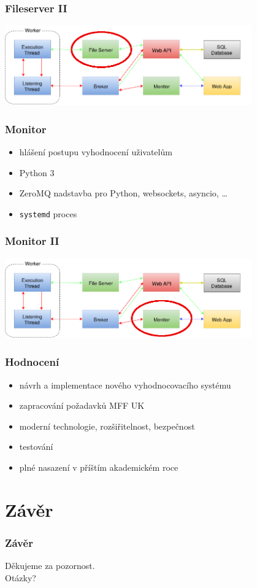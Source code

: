 \documentclass{beamer}
\begin{document}
\begin{frame}
	\frametitle{Fileserver II}
	\begin{center}
		\includegraphics[width=0.8\textwidth]{images/communication-fileserver.png}
	\end{center}
\end{frame}

\begin{frame}
	\frametitle{Monitor}
	\begin{itemize}
		\item hlášení postupu vyhodnocení uživatelům
		\item Python 3
		\item ZeroMQ nadstavba pro Python, websockets, asyncio, \dots
		\item \texttt{systemd} proces
	\end{itemize}
\end{frame}

\begin{frame}
	\frametitle{Monitor II}
	\begin{center}
		\includegraphics[width=0.8\textwidth]{images/communication-monitor.png}
	\end{center}
\end{frame}

\begin{frame}
	\frametitle{Hodnocení}
	\begin{itemize}
		\item návrh a implementace nového vyhodnocovacího systému
		\item zapracování požadavků MFF UK
		\item moderní technologie, rozšiřitelnost, bezpečnost
		\item testování
		\item plné nasazení v příštím akademickém roce
	\end{itemize}
\end{frame}

\section{Závěr}
\begin{frame}
	\frametitle{Závěr}
	\centering
	Děkujeme za pozornost.\\
	\LARGE{Otázky?}
\end{frame}
\end{document}
